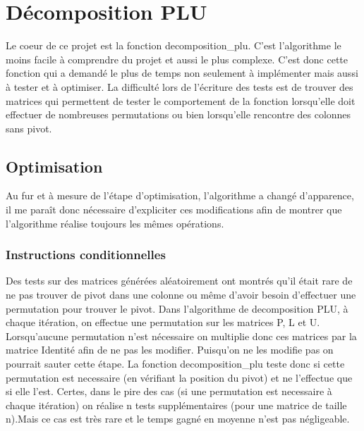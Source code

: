 \documentclass[11pt]{article}
\begin{document}
\section{Décomposition PLU}
Le coeur de ce projet est la fonction decomposition\_plu. C'est l'algorithme le moins facile à comprendre du projet et aussi le plus complexe. C'est donc cette fonction qui a demandé le plus de temps non seulement à implémenter mais aussi à tester et à optimiser.  La difficulté lors de l'écriture des tests est de trouver des matrices qui permettent de tester le comportement de la fonction lorsqu'elle doit effectuer de nombreuses permutations ou bien lorsqu'elle rencontre des colonnes sans pivot.


\subsection{Optimisation}
Au fur et à mesure de l'étape d'optimisation, l'algorithme a changé d'apparence, il me paraît donc nécessaire d'expliciter ces modifications afin de montrer que l'algorithme réalise toujours les mêmes opérations.

\subsubsection{Instructions conditionnelles}
Des tests sur des matrices générées aléatoirement ont montrés qu'il était rare de ne pas trouver de pivot dans une colonne ou même d'avoir besoin d'effectuer une permutation pour trouver le pivot. Dans l'algorithme de decomposition PLU, à chaque itération, on effectue une permutation sur les matrices P, L et U. Lorsqu'aucune permutation n'est nécessaire on multiplie donc ces matrices par la matrice Identité afin de ne pas les modifier. Puisqu'on ne les modifie pas on pourrait sauter cette étape. La fonction decomposition\_plu teste donc si cette permutation est necessaire (en vérifiant la position du pivot) et ne l'effectue que si elle l'est. Certes, dans le pire des cas (si une permutation est necessaire à chaque itération) on réalise n tests supplémentaires (pour une matrice de taille n).Mais ce cas est très rare et le temps gagné en moyenne n'est pas négligeable.
\end{document}

